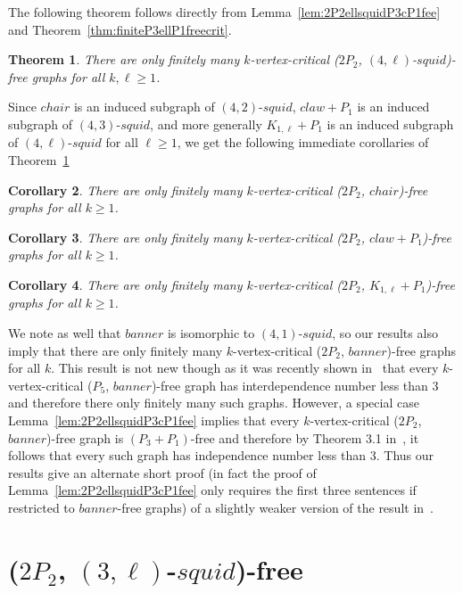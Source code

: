 \documentclass[11pt]{article}
\newtheorem{theorem}{Theorem}[section]
\newtheorem{corollary}[theorem]{Corollary}
\theoremstyle{definition}
\newcommand{\squid}[1]{$(4,#1)$-$squid$}
\newcommand{\hl}[1]{$(3,#1)$-$squid$}
\begin{document}
The following theorem follows directly from Lemma~\ref{lem:2P2ellsquidP3cP1fee} and Theorem~\ref{thm:finiteP3ellP1freecrit}.

\begin{theorem}\label{thm:2P2ellsquidcrit}
There are only finitely many $k$-vertex-critical ($2P_2$, \squid{\ell})-free graphs for all $k,\ell\ge 1$.
\end{theorem}

Since $chair$ is an induced subgraph of \squid{2}, $claw+P_1$ is an induced subgraph of \squid{3}, and more generally  $K_{1,\ell}+P_1$ is an induced subgraph of \squid{\ell} for all $\ell\ge 1$, we get the following immediate corollaries of Theorem~\ref{thm:2P2ellsquidcrit} 

\begin{corollary}
There are only finitely many $k$-vertex-critical ($2P_2$, $chair$)-free graphs for all $k\ge 1$.
\end{corollary}

\begin{corollary}
There are only finitely many $k$-vertex-critical ($2P_2$, $claw+P_1$)-free graphs for all $k\ge 1$.
\end{corollary}

\begin{corollary}
There are only finitely many $k$-vertex-critical ($2P_2$, $K_{1,\ell}+P_1$)-free graphs for all $k\ge 1$.
\end{corollary}

We note as well that $banner$ is isomorphic to \squid{1}, so our results also imply that there are only finitely many $k$-vertex-critical ($2P_2$, $banner$)-free graphs for all $k$. This result is not new though as it was recently shown in~\cite{Brause2022} that every $k$-vertex-critical ($P_5$, $banner$)-free graph has interdependence number less than $3$ and therefore there only finitely many such graphs.  However, a special case Lemma~\ref{lem:2P2ellsquidP3cP1fee} implies that every $k$-vertex-critical ($2P_2$, $banner$)-free graph is $(P_3+P_1)$-free and therefore by Theorem 3.1 in~\cite{CameronHoangSawada2022}, it follows that every such graph has independence number less than $3$. Thus our results give an alternate short proof (in fact the proof of Lemma~\ref{lem:2P2ellsquidP3cP1fee} only requires the first three sentences if restricted to $banner$-free graphs) of a slightly weaker version of the result in~\cite{Brause2022}.



\section{($2P_2$, \hl{\ell})-free}\label{sec:fountain}
\end{document}
